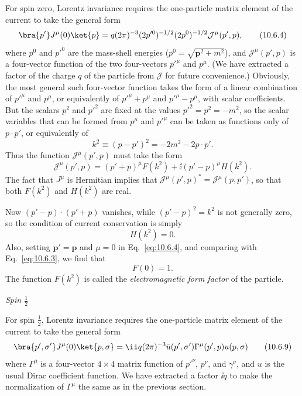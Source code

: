 For spin zero, Lorentz invariance requires the one-particle matrix element of
the current to take the general form
\begin{equation}
  \bra{p'}J^\mu(0)\ket{p}
  =q(2\pi)^{-3}(2p'^0)^{-1/2}(2p^0)^{-1/2}\mathcal J^\mu(p',p),
  \tag{10.6.4}\label{eq:10.6.4}
\end{equation}
where $p^0$ and $p'^0$ are the mass-shell energies
($p^0=\sqrt{\mathbf{p}^2+m^2}$), and $\mathcal J^\mu(p',p)$ is a four-vector
function of the two four-vectors $p'^\mu$ and $p^\mu$. (We have extracted a
factor of the charge $q$ of the particle from $\mathcal J$ for future
convenience.) Obviously, the most general such four-vector function takes the
form of a linear combination of $p'^\mu$ and $p^\mu$, or equivalently of
$p'^\mu+p^\mu$ and $p'^\mu-p^\mu$, with scalar coefficients. But the scalars
$p^2$ and $p'^2$ are fixed at the values $p'^2=p^2=-m^2$, so the scalar
variables that can be formed from $p^\mu$ and $p'^\mu$ can be taken as
functions only of $p\cdot p'$, or equivalently of
\begin{equation}
  k^2\equiv(p-p')^2=-2m^2-2p\cdot p'.
  \tag{10.6.5}\label{eq:10.6.5}
\end{equation}
Thus the function $\mathcal J^\mu(p',p)$ must take the form
\begin{equation}
  \mathcal J^\mu(p',p)
  =(p'+p)^\mu F(k^2)+\ii(p'-p)^\mu H(k^2).
  \tag{10.6.6}\label{eq:10.6.6}
\end{equation}
The fact that $J^\mu$ is Hermitian implies that
$\mathcal J^\mu(p',p)^*=\mathcal J^\mu(p,p')$, so that both $F(k^2)$ and
$H(k^2)$ are real.

Now $(p'-p)\cdot(p'+p)$ vanishes, while $(p'-p)^2=k^2$ is not generally
zero, so the condition of current conservation is simply
\begin{equation}
  H(k^2)=0.
  \tag{10.6.7}\label{eq:10.6.7}
\end{equation}
Also, setting $\mathbf{p}'=\mathbf{p}$ and $\mu=0$ in
Eq.~\eqref{eq:10.6.4}, and comparing with Eq.~\eqref{eq:10.6.3}, we find that
\begin{equation}
  F(0)=1.
  \tag{10.6.8}\label{eq:10.6.8}
\end{equation}
The function $F(k^2)$ is called the \emph{electromagnetic form factor} of the
particle.

\begin{center}
  \emph{Spin $\frac12$}
\end{center}

For spin $\frac12$, Lorentz invariance requires the one-particle matrix element
of the current to take the general form
\begin{equation}
  \bra{p',\sigma'}J^\mu(0)\ket{p,\sigma}
  =\ii q(2\pi)^{-3}\bar u(p',\sigma')\Gamma^\mu(p',p)u(p,\sigma)
  \tag{10.6.9}\label{eq:10.6.9}
\end{equation}
where $\Gamma^\mu$ is a four-vector $4\times4$ matrix function of $p'^\nu$,
$p^\nu$, and $\gamma^\nu$, and $u$ is the usual Dirac coefficient function.
We have extracted a factor $\ii q$ to make the normalization of $\Gamma^\mu$ the
same as in the previous section.

